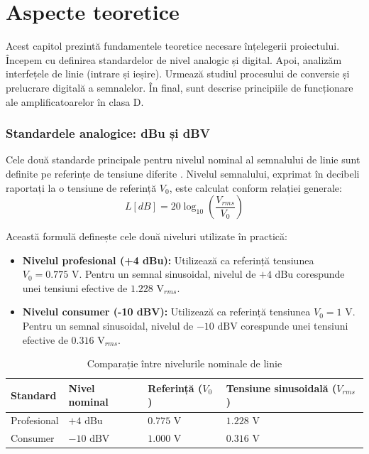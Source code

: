 \chapter{Aspecte teoretice \label{theory}}

Acest capitol prezintă fundamentele teoretice necesare înțelegerii proiectului. Începem cu definirea standardelor de nivel analogic și digital. Apoi, analizăm interfețele de linie (intrare și ieșire). Urmează studiul procesului de conversie și prelucrare digitală a semnalelor. În final, sunt descrise principiile de funcționare ale amplificatoarelor în clasa D.
\subsection{Standardele analogice: dBu și dBV}
Cele două standarde principale pentru nivelul nominal al semnalului de linie sunt definite pe referințe de tensiune diferite \cite{douglasself}. Nivelul semnalului, exprimat în decibeli raportați la o tensiune de referință $V_0$, este calculat conform relației generale:
\begin{equation}
    L [dB] = 20 \log_{10} \left( \frac{V_{rms}}{V_0} \right)
\end{equation}

Această formulă definește cele două niveluri utilizate în practică:
\begin{itemize}
    \item \textbf{Nivelul profesional (+4 dBu):} Utilizează ca referință tensiunea $V_0 = 0.775\text{ V}$. Pentru un semnal sinusoidal, nivelul de $+4\text{ dBu}$ corespunde unei tensiuni efective de $1.228\text{ V}_{rms}$.
    \item \textbf{Nivelul consumer (-10 dBV):} Utilizează ca referință tensiunea $V_0 = 1\text{ V}$. Pentru un semnal sinusoidal, nivelul de $-10\text{ dBV}$ corespunde unei tensiuni efective de $0.316\text{ V}_{rms}$.
\end{itemize}

\begin{table}[ht]
    \centering
    \begin{tabular}{@{}llll@{}}
        \toprule
        \textbf{Standard} & \textbf{Nivel nominal} & \textbf{Referință ($V_0$)} & \textbf{Tensiune sinusoidală ($V_{rms}$)} \\ \midrule
        Profesional       & $+4\text{ dBu}$       & $0.775\text{ V}$   & $1.228\text{ V}$              \\
        Consumer          & $-10\text{ dBV}$      & $1.000\text{ V}$   & $0.316\text{ V}$              \\ \bottomrule
    \end{tabular}
    \vspace{2mm}
    \caption{Comparație între nivelurile nominale de linie}
    \label{tab:audio_levels}
\end{table}

